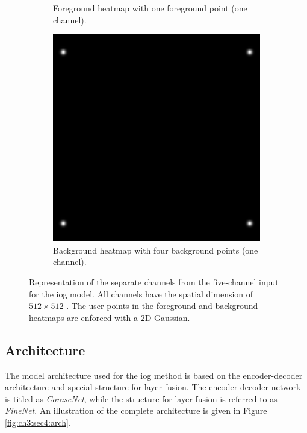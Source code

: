 \begin{figure}
\begin{subfigure}[b]{0.3\textwidth}
		\caption{Foreground heatmap with one foreground point (one channel).}
		\label{fig:ch3:sec4:fg_channel}
	\end{subfigure}
	\hfill
	\begin{subfigure}[b]{0.3\textwidth}
		\centering
		\includegraphics[width=\textwidth]{figures/chap34_channel_bg.png}
		\caption{Background heatmap with four background points (one channel).}
		\label{fig:ch3:sec4:bg_channel}
	\end{subfigure}
	\caption[Five-channel IOG model input]{
		Representation of the separate channels from the five-channel input for the \gls{iog} model.
		All channels have the spatial dimension of $512 \times 512$ .
		The user points in the foreground and background heatmaps are enforced with a 2D Gaussian.
	} \label{fig:ch3:sec4:model_input_channels}
\end{figure}

\subsection{Architecture}\label{ord:ch3:sec4:subsec3}

The model architecture used for the \gls{iog} method is based on the encoder-decoder architecture and special structure for layer fusion.
The encoder-decoder network is titled as \textit{CoraseNet}, while the structure for layer fusion is referred to as \textit{FineNet}.
An illustration of the complete architecture is given in Figure \ref{fig:ch3:sec4:arch}.


